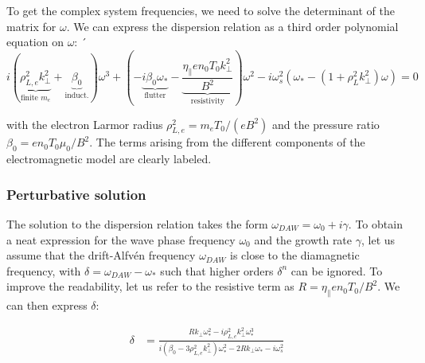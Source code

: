To get the complex system frequencies, we need to solve the determinant of the matrix for $\omega$. We can express the dispersion relation as a third order polynomial equation on $\omega$:
´\begin{equation}
	\label{eq:edge_DAWdispersionRelation}
	i\left(\underbrace{\rho_{L,e}^2k_\perp^2}_{\text{finite }m_e} + \underbrace{\beta_0}_{\text{induct.}}\right)\omega^3 + \left(-\underbrace{i\beta_0\omega_*}_{\text{flutter}} - \underbrace{\frac{\eta_\parallel en_0T_0k_\perp^2}{B^2}}_{\text{resistivity}}\right)\omega^2 - i\omega_s^2\left(\omega_*-\left(1 + \rho_L^2 k_\perp^2\right)\omega\right) = 0
\end{equation}

with the electron Larmor radius $\rho_{L,e}^2 = m_eT_0/(eB^2)$ and the pressure ratio $\beta_0 = en_0T_0 \mu_0 / B^2$. The terms arising from the different components of the electromagnetic model are clearly labeled. 



\subsubsection{Perturbative solution}
\label{ssec:edge_DAW_perturbativeSolution}


The solution to the dispersion relation takes the form $\omega_{DAW} = \omega_0 +i\gamma$. To obtain a neat expression for the wave phase frequency $\omega_0$ and the growth rate $\gamma$, let us assume that the drift-Alfvén frequency $\omega_{DAW}$ is close to the diamagnetic frequency, with $\delta = \omega_{DAW} - \omega_*$ such that higher orders $\delta^n$ can be ignored. To improve the readability, let us refer to the resistive term as $R = \eta_\parallel en_0T_0/B^2$. We can then express $\delta$: 

\begin{align}
	\delta &= \frac{Rk_\perp\omega_*^2 - i\rho_{L,e}^2k_\perp^2\omega_*^3}{i\left(\beta_0 - 3\rho_{L,e}^2k_\perp^2\right)\omega_*^2 - 2Rk_\perp\omega_* - i\omega_s^2} %
\end{align}


